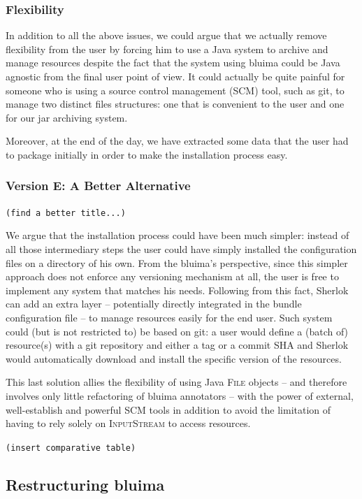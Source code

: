 \documentclass{article}
\newcommand{\ID}[1]{\mbox{\textsc{#1}}}
\newcommand{\TODO}[1]{\texttt{\textcolor{YellowOrange}{(#1)}}} %
\begin{document}
\subsubsection{Flexibility}

In addition to all the above issues, we could argue that we actually remove flexibility from the user by forcing him to use a Java system to archive and manage resources despite the fact that the system using bluima could be Java agnostic from the final user point of view. It could actually be quite painful for someone who is using a source control management (SCM) tool, such as git, to manage two distinct files structures: one that is convenient to the user and one for our jar archiving system.

Moreover, at the end of the day, we have extracted some data that the user had to package initially in order to make the installation process easy.

\subsubsection{Version E: A Better Alternative}

\TODO{find a better title...}

We argue that the installation process could have been much simpler: instead of all those intermediary steps the user could have simply installed the configuration files on a directory of his own. From the bluima's perspective, since this simpler approach does not enforce any versioning mechanism at all, the user is free to implement any system that matches his needs. Following from this fact, Sherlok can add an extra layer -- potentially directly integrated in the bundle configuration file -- to manage resources easily for the end user. Such system could (but is not restricted to) be based on git: a user would define a (batch of) resource(s) with a git repository and either a tag or a commit SHA and Sherlok would automatically download and install the specific version of the resources.

This last solution allies the flexibility of using Java \ID{File} objects -- and therefore involves only little refactoring of bluima annotators -- with the power of external, well-establish and powerful SCM tools in addition to avoid the limitation of having to rely solely on \ID{InputStream} to access resources.

\TODO{insert comparative table}

\subsection{Restructuring bluima}
\end{document}
